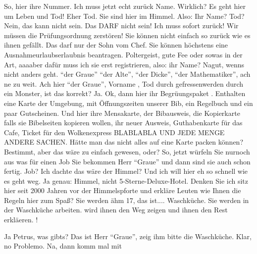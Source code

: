 \begin{verseplay}[5em]
\s{\Gandalf} So, hier ihre Nummer. Ich muss jetzt echt  zurück
\s{\Petrus} Name.
\s{\Gandalf} Wirklich? Es geht hier um Leben und Tod!
\s{\Petrus} Eher Tod. Sie sind hier im Himmel. Also: Ihr Name?
\s{\Gandalf} Tod? Nein, das kann nicht sein. Das DARF nicht sein! Ich muss sofort zurück! Wir müssen die Prüfungsordnung zerstören!
\s{\Petrus} Sie können nicht einfach so zurück wie es ihnen gefällt. Das darf nur der Sohn vom Chef. Sie können höchstens eine Ausnahmeurlaubserlaubnis beantragen. Poltergeist, gute Fee oder sowas in der Art, aaaaber dafür muss ich sie erst registrieren, also: ihr Name?
\s{\Gandalf} Nagut, wenns nicht anders geht. "`der Graue"'
\s{\Petrus}  "`der Alte"', "`der Dicke"', "`der Mathematiker"', ach ne zu weit. Ach hier "`der Graue"', Vorname \Gandalf, Tod durch gefressenwerden durch ein Monster, ist das korrekt?
\s{\Gandalf} Ja.
\s{\Petrus} Ok,  dann hier ihr Begrüungspaket . Enthalten eine Karte der Umgebung, mit Öffnungszeiten unserer Bib, ein Regelbuch und ein paar Gutscheinen. Und hier  ihre Mensakarte, der Bibausweis, die Kopierkarte falls sie Bibelseiten kopieren wollen, ihr neuer Ausweis, Guthabenkarte für das Cafe, Ticket für den Wolkenexpress BLABLABLA UND JEDE MENGE ANDERE SACHEN.
\s{\Gandalf} Hätte man das nicht alles auf eine Karte packen können?
\s{\Petrus} Bestimmt, aber das wäre zu einfach gewesen, oder? So, jetzt würfeln Sie nurnoch aus was für einen Job Sie bekommen Herr "`Graue"'  und dann sind sie auch schon fertig.
\s{\Gandalf} Job? Ich dachte das wäre der Himmel? Und ich will hier eh so schnell wie es geht weg.
\s{\Petrus} Ja genau: Himmel, nicht 5-Sterne-Deluxe-Hotel. Denken Sie ich sitz hier seit 2000 Jahren vor der Himmelspforte und erkläre Leuten wie Ihnen die Regeln hier zum Spaß? Sie werden  ähm 17, das ist.... Waschküche. Sie werden in der Waschküche arbeiten. \Euler wird ihnen den Weg zeigen und ihnen den Rest erkläeren.  \Euler!
\end{verseplay}
\begin{verseplay}[5em]
\s{\Euler} Ja Petrus, was gibts?
\s{\Petrus} Das ist Herr "`Graue"', zeig ihm bitte die Waschküche.
\s{\Euler} Klar, no Problemo. Na, dann komm mal mit
\end{verseplay}
